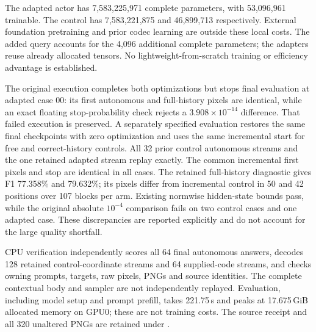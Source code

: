 \documentclass[10pt,a4paper]{article}
\begin{document}
The adapted actor has 7,583,225,971 complete parameters, with 53,096,961
trainable. The control has 7,583,221,875 and 46,899,713 respectively. External
foundation pretraining and prior codec learning are outside these local
costs. The added query accounts for the 4,096 additional complete parameters;
the adapters reuse already allocated tensors. No lightweight-from-scratch
training or efficiency advantage is established.

The original execution completes both optimizations but stops final
evaluation at adapted case 00: its first autonomous and full-history pixels
are identical, while an exact floating stop-probability check rejects a
$3.908\times10^{-14}$ difference. That failed execution is preserved.
A separately specified evaluation restores the same final checkpoints with
zero optimization and uses the same incremental start for free and
correct-history controls. All 32 prior control autonomous streams and the
one retained adapted stream replay exactly. The common incremental first
pixels and stop are identical in all cases. The retained full-history
diagnostic gives F1 77.358\% and 79.632\%; its pixels differ from incremental
control in 50 and 42 positions over 107 blocks per arm. Existing normwise
hidden-state bounds pass, while the original absolute $10^{-4}$ comparison
fails on two control cases and one adapted case. These discrepancies are
reported explicitly and do not account for the large quality shortfall.

CPU verification independently scores all 64 final autonomous answers,
decodes 128 retained control-coordinate streams and 64 supplied-code
streams, and checks owning prompts, targets, raw pixels, PNGs and source
identities. The complete contextual body and sampler are not independently
replayed. Evaluation, including model setup and prompt prefill, takes
221.75\,s and peaks at 17.675\,GiB allocated memory on GPU0; these are not
training costs. The source receipt and all 320 unaltered PNGs are retained
under .

\end{document}

